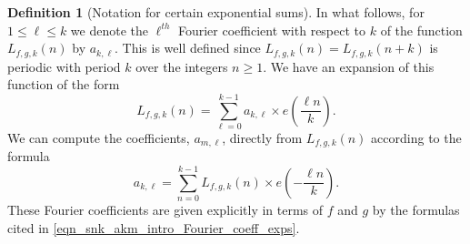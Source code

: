 \documentclass[12pt,reqno,a4letter]{article}
\numberwithin{figure}{section}
\numberwithin{table}{section}
\numberwithin{equation}{section}
\newcommand{\e}[1]{e\left(#1\right)}
\theoremstyle{plain}
\numberwithin{theorem}{section}
\theoremstyle{definition}
\newtheorem{definition}[theorem]{Definition}
\begin{document}
\begin{definition}[Notation for certain exponential sums] 
\label{def_NotationAndSpecialExpSums} 
In what follows, for $1 \leq \ell \leq k$ 
we denote the $\ell^{th}$ Fourier coefficient with respect to $k$ 
of the function $L_{f,g,k}(n)$ by $a_{k,\ell}$. This is well defined since 
$L_{f,g,k}(n) = L_{f,g,k}(n+k)$ is periodic with period $k$ over the 
integers $n \geq 1$. We have an expansion of this function of the form 
\[
L_{f,g,k}(n) = \sum_{\ell=0}^{k-1} a_{k,\ell} \times \e{\frac{\ell n}{k}}. 
\] 
We can compute the coefficients, $a_{m,\ell}$, 
directly from $L_{f,g,k}(n)$ according to the formula 
\[
a_{k,\ell} = \sum_{n=0}^{k-1} L_{f,g,k}(n) \times \e{-\frac{\ell n}{k}}. 
\] 
These Fourier coefficients are given explicitly in terms of 
$f$ and $g$ by the formulas cited in 
\eqref{eqn_snk_akm_intro_Fourier_coeff_exps}. 
\end{definition} 
\end{document}
